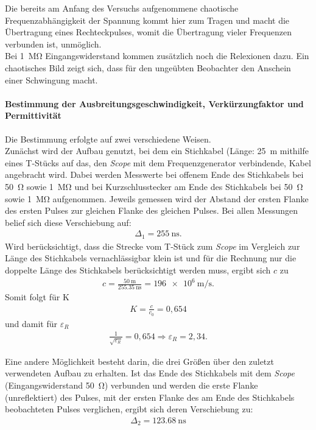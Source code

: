 \documentclass[a4paper,twoside,final]{article}
\begin{document}
Die bereits am Anfang des Versuchs aufgenommene chaotische Frequenzabhängigkeit der Spannung kommt hier zum Tragen und macht die Übertragung eines Rechteckpulses, womit die Übertragung vieler Frequenzen verbunden ist, unmöglich. \\
Bei \SI{1}{\mega\ohm} Eingangswiderstand kommen zusätzlich noch die Relexionen dazu. Ein chaotisches Bild zeigt sich, dass für den ungeübten Beobachter den Anschein einer Schwingung macht.
\newpage
\paragraph{Bestimmung der Ausbreitungsgeschwindigkeit, Verkürzungfaktor und Permittivität}
Die Bestimmung erfolgte auf zwei verschiedene Weisen. \\
Zunächst wird der Aufbau genutzt, bei dem ein Stichkabel (Länge: \SI{25}{\metre} mithilfe eines T-Stücks auf das, den \textit{Scope} mit dem Frequenzgenerator verbindende, Kabel angebracht wird. Dabei werden Messwerte bei offenem Ende des Stichkabels bei \SI{50}{\ohm} sowie \SI{1}{\mega\ohm} und bei Kurzschlusstecker am Ende des Stichkabels bei \SI{50}{\ohm} sowie \SI{1}{\mega\ohm} aufgenommen. Jeweils gemessen wird der Abstand der ersten Flanke des ersten Pulses zur gleichen Flanke des gleichen Pulses. Bei allen Messungen belief sich diese Verschiebung auf:
\begin{align}
\Delta_1 = \SI{255}{\nano\second}.
\end{align}
Wird berücksichtigt, dass die Strecke vom T-Stück zum \textit{Scope} im Vergleich zur Länge des Stichkabels vernachlässigbar klein ist und für die Rechnung nur die doppelte Länge des Stichkabels berücksichtigt werden muss, ergibt sich $c$ zu
\begin{align}
c = \frac{\SI{50}{\metre}}{\SI{255,35}{\nano\second}} = \SI{196e6}{\metre\per\second}.
\end{align}
Somit folgt für K
\begin{align}
K = \frac{c}{c_0} = 0,654
\end{align}
und damit für $\varepsilon_R$
\begin{align}
\frac{1}{\sqrt{\varepsilon_R}} = 0,654 \Rightarrow \varepsilon_R = 2,34.
\end{align}

Eine andere Möglichkeit besteht darin, die drei Größen über den zuletzt verwendeten Aufbau zu erhalten. Ist das Ende des Stichkabels mit dem \textit{Scope} (Eingangswiderstand \SI{50}{\ohm}) verbunden und werden die erste Flanke (unreflektiert) des Pulses, mit der ersten Flanke des am Ende des Stichkabels beobachteten Pulses verglichen, ergibt sich deren Verschiebung zu:
\begin{align}
\Delta_2  = \SI{123,68}{\nano\second}
\end{align}
\end{document}
